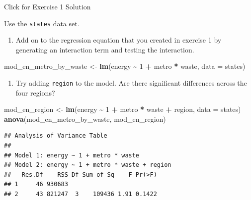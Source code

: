 \documentclass[
]{book}
\newenvironment{Shaded}{\begin{snugshade}}{\end{snugshade}}
\newcommand{\DataTypeTok}[1]{\textcolor[rgb]{0.13,0.29,0.53}{#1}}
\newcommand{\DecValTok}[1]{\textcolor[rgb]{0.00,0.00,0.81}{#1}}
\newcommand{\KeywordTok}[1]{\textcolor[rgb]{0.13,0.29,0.53}{\textbf{#1}}}
\newcommand{\NormalTok}[1]{#1}
\newcommand{\OperatorTok}[1]{\textcolor[rgb]{0.81,0.36,0.00}{\textbf{#1}}}
\newcommand{\StringTok}[1]{\textcolor[rgb]{0.31,0.60,0.02}{#1}}
\providecommand{\tightlist}{%
  \setlength{\itemsep}{0pt}\setlength{\parskip}{0pt}}
\begin{document}
{Click for Exercise 1 Solution}

\begin{alert}

Use the \texttt{states} data set.

\begin{enumerate}
\def\labelenumi{\arabic{enumi}.}
\tightlist
\item
  Add on to the regression equation that you created in exercise 1 by generating an interaction term and testing the interaction.
\end{enumerate}

\begin{Shaded}
\begin{Highlighting}[]
\NormalTok{  mod\_en\_metro\_by\_waste \textless{}{-}}\StringTok{ }\KeywordTok{lm}\NormalTok{(energy }\OperatorTok{\textasciitilde{}}\StringTok{ }\DecValTok{1} \OperatorTok{+}\StringTok{ }\NormalTok{metro }\OperatorTok{*}\StringTok{ }\NormalTok{waste, }\DataTypeTok{data =}\NormalTok{ states)}
\end{Highlighting}
\end{Shaded}

\begin{enumerate}
\def\labelenumi{\arabic{enumi}.}
\setcounter{enumi}{1}
\tightlist
\item
  Try adding \texttt{region} to the model. Are there significant differences across the four regions?
\end{enumerate}

\begin{Shaded}
\begin{Highlighting}[]
\NormalTok{  mod\_en\_region \textless{}{-}}\StringTok{ }\KeywordTok{lm}\NormalTok{(energy }\OperatorTok{\textasciitilde{}}\StringTok{ }\DecValTok{1} \OperatorTok{+}\StringTok{ }\NormalTok{metro }\OperatorTok{*}\StringTok{ }\NormalTok{waste }\OperatorTok{+}\StringTok{ }\NormalTok{region, }\DataTypeTok{data =}\NormalTok{ states)}
  \KeywordTok{anova}\NormalTok{(mod\_en\_metro\_by\_waste, mod\_en\_region)}
\end{Highlighting}
\end{Shaded}

\begin{verbatim}
## Analysis of Variance Table
## 
## Model 1: energy ~ 1 + metro * waste
## Model 2: energy ~ 1 + metro * waste + region
##   Res.Df    RSS Df Sum of Sq    F Pr(>F)
## 1     46 930683                         
## 2     43 821247  3    109436 1.91 0.1422
\end{verbatim}

\end{alert}
\end{document}
